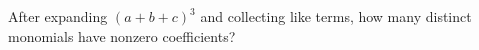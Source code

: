 After expanding $(a+b+c)^3$ and collecting like terms, how many distinct monomials have nonzero coefficients?
